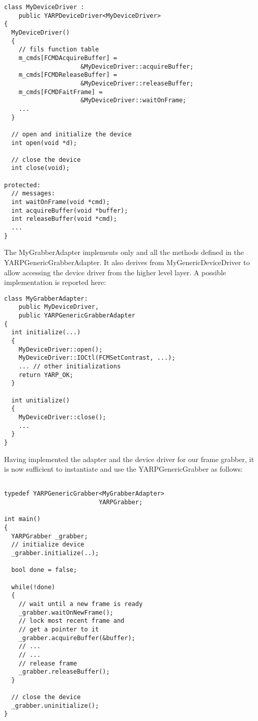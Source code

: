 {\small \begin{verbatim}
class MyDeviceDriver : 
	public YARPDeviceDriver<MyDeviceDriver>
{
  MyDeviceDriver()
  {
    // fils function table
    m_cmds[FCMDAcquireBuffer] =
                     &MyDeviceDriver::acquireBuffer;
    m_cmds[FCMDReleaseBuffer] =
                     &MyDeviceDriver::releaseBuffer;
    m_cmds[FCMDFaitFrame] = 
                     &MyDeviceDriver::waitOnFrame;
    ...
  }

  // open and initialize the device
  int open(void *d);

  // close the device
  int close(void);

protected:
  // messages:
  int waitOnFrame(void *cmd);
  int acquireBuffer(void *buffer);
  int releaseBuffer(void *cmd);
  ...
}
\end{verbatim}}

 The MyGrabberAdapter implements only and all the methods defined in the YARPGenericGrabberAdapter. It also derives from MyGenericDeviceDriver to allow accessing the device driver from the higher level layer. A possible implementation is reported here:

{\small \begin{verbatim}
class MyGrabberAdapter: 
	public MyDeviceDriver,
	public YARPGenericGrabberAdapter
{
  int initialize(...)
  {
    MyDeviceDriver::open();
    MyDeviceDriver::IOCtl(FCMSetContrast, ...);
    ... // other initializations
    return YARP_OK;
  }

  int unitialize()
  {
    MyDeviceDriver::close();
    ...
  }
}
\end{verbatim}}

Having implemented the adapter and the device driver for our frame grabber, it is now sufficient to instantiate and use the YARPGenericGrabber as follows:

{\small
\begin{verbatim}

typedef YARPGenericGrabber<MyGrabberAdapter> 
                          YARPGrabber;

int main()
{
  YARPGrabber _grabber;
  // initialize device
  _grabber.initialize(..);
  
  bool done = false;

  while(!done)
  {
    // wait until a new frame is ready
    _grabber.waitOnNewFrame();
    // lock most recent frame and
    // get a pointer to it
    _grabber.acquireBuffer(&buffer);
    // ...
    // ...
    // release frame
    _grabber.releaseBuffer();
  }

  // close the device
  _grabber.uninitialize();
}
\end{verbatim}
}
